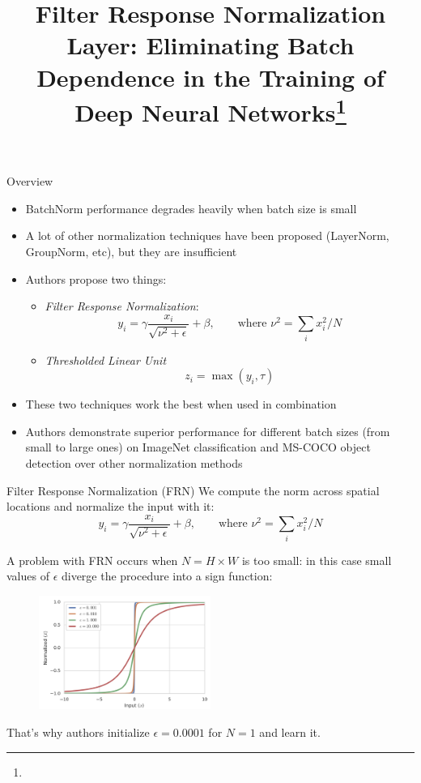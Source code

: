 \documentclass[handout, 10pt]{beamer}
\title{Filter Response Normalization Layer: Eliminating Batch Dependence in the Training of Deep Neural Networks\footnote{\citepaper{fr_norm}}}
\begin{document}
\begin{frame}
    \titlepage
\end{frame}


\begin{frame}{Overview}
\begin{itemize}
    \item\pause BatchNorm performance degrades heavily when batch size is small
    \item\pause A lot of other normalization techniques have been proposed (LayerNorm, GroupNorm, etc), but they are insufficient
    \item\pause Authors propose two things:
    \begin{itemize}
        \item\pause \textit{Filter Response Normalization}:
\begin{equation}
y_{i}=\gamma \frac{x_{i}}{\sqrt{\nu^{2}+\epsilon}}+\beta, \qquad\text{where } \nu^{2}=\sum_{i} x_{i}^{2} / N
\end{equation}
        \item\pause \textit{Thresholded Linear Unit}
        \begin{equation}
z_{i}=\max \left(y_{i}, \tau\right)
\end{equation}
    \end{itemize}
    \item\pause These two techniques work the best when used in combination
    \item\pause Authors demonstrate superior performance for different batch sizes (from small to large ones) on ImageNet classification and MS-COCO object detection over other normalization methods
\end{itemize}
\end{frame}


\begin{frame}{Filter Response Normalization (FRN)}
\pause
We compute the norm across spatial locations and normalize the input with it:
\begin{equation}
y_{i}=\gamma \frac{x_{i}}{\sqrt{\nu^{2}+\epsilon}}+\beta, \qquad\text{where } \nu^{2}=\sum_{i} x_{i}^{2} / N
\end{equation}

\pause
A problem with FRN occurs when $N = H \times W$ is too small: in this case small values of $\epsilon$ diverge the procedure into a sign function:
\begin{figure}
\centering
\includegraphics[width=0.5\textwidth]{images/sign-function-divergence}
\end{figure}

That's why authors initialize $\epsilon = 0.0001$ for $N=1$ and learn it.
\end{frame}
\end{document}
